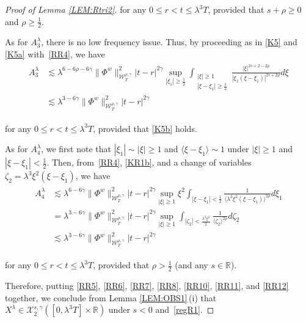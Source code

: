 \documentclass[letterpaper, 11pt,  reqno]{amsart}
\DeclareMathOperator*{\intt}{\int}
\newcommand{\1}{\hspace{0.5mm}\text{I}\hspace{0.5mm}}
\newcommand{\noi}{\noindent}
\newcommand{\R}{\mathbb{R}}
\newcommand{\g}{\gamma}
\newcommand{\ld}{\lambda}
\newcommand{\les}{\lesssim}
\newcommand{\jb}[1]
{\langle #1 \rangle}
\newcommand{\cX}{\mathcal{X}}
\newcommand{\W}{\mathcal{W}}
\newcommand{\z}{\zeta}
\numberwithin{equation}{section}
\numberwithin{theorem}{section}
\begin{document}
\begin{proof}[Proof of Lemma \ref{LEM:Rtri2}]
\noi
for any $0 \le r < t \le \ld^3T$, 
provided that $s + \rho \ge 0$
and $\rho \ge \frac 12$.






As for $A^\ld_3$, 
there is no low frequency issue.
Thus, by 
proceeding as in \eqref{K5} and \eqref{K5a} with~\eqref{RR4}, we have
\begin{align}
\begin{aligned}
A_3^\ld
& \les
\ld^{6 - 6\rho - 6\g}
\|\Phi^w\|^2_{\W_T^{\rho,\g}}|t-r |^{2\g}
\sup_{|\xi_1|\ge \frac 12}
\intt_{\substack{|\xi|\ge 1\\|\xi-\xi_1|\ge \frac 12 }} 
\frac{|\xi|^{2s+2-2\rho}}{|\xi_1(\xi - \xi_1)|^{2s+2\rho}} d\xi\\
& \les
\ld^{3 - 6\g}
\|\Phi^w\|^2_{\W_T^{\rho,\g}}|t-r |^{2\g}
\end{aligned}
\label{RR11}
\end{align}

\noi
for any $0 \le r <  t \le \ld^3T$, 
provided that
\eqref{K5b} holds.

As for $A_4^\ld$, 
we first note that 
$ |\xi_1|\sim |\xi| \ge 1$
and $\jb{\xi - \xi_1}\sim 1$
under 
 $|\xi|\ge1$ and $|\xi - \xi_1|< \frac12 $.
 Then, from~\eqref{RR4}, \eqref{KR1b},  and a change of variables
 $\z_2  = \ld^3 \xi^2 (\xi - \xi_1)$, we have 
 \begin{align}
\begin{aligned}
A_4^\ld
&\les \ld^{6 - 6\g}
\|\Phi^w\|^2_{\W_T^{\rho,\g}}
|t-r |^{2\g }    \sup_{|\xi|\ge 1}  \xi^2
  \intt_{|\xi - \xi_1|< \frac 12} 
\frac{ 1}{  \jb{\ld^3 \xi^2(\xi - \xi_1)}^{2\rho}} d \xi_1\\
&= \ld^{3 - 6\g}
\|\Phi^w\|^2_{\W_T^{\rho,\g}}
|t-r |^{2\g }  
   \sup_{|\xi|\ge 1}  
  \intt_{|\z_2|< \frac {\ld^3 \xi^2}2} 
 \frac{1}{\jb{\z_2}^{2\rho} }d \z_2\\
&  \les \ld^{3 - 6\g}\|\Phi^w\|^2_{\W_T^{\rho,\g}}
|t-r |^{2\g } 
\end{aligned}
\label{RR12}
\end{align}

\noi
for any $0 \le r <  t \le \ld^3T$, provided that $\rho > \frac 12$
(and any $s \in \R$).



Therefore, putting 
\eqref{RR5}, \eqref{RR6}, 
\eqref{RR7}, \eqref{RR8}, 
\eqref{RR10}, 
\eqref{RR11}, 
and \eqref{RR12}
together, we conclude 
from  Lemma \ref{LEM:OBS1}\,(i)
that 
 $X^\ld\in  \cX^{s, \g}_2([0, \ld^3 T]\times \R)$ under
 $s< 0$ and~\eqref{regR1}.
\end{proof}
\end{document}
